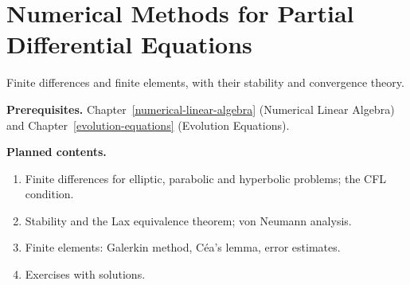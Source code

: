 \chapter{Numerical Methods for Partial Differential Equations}\label{numerical-pde}

Finite differences and finite elements, with their stability and convergence theory.

\noindent\textbf{Prerequisites.} Chapter~\ref{numerical-linear-algebra} (Numerical Linear Algebra) and Chapter~\ref{evolution-equations} (Evolution Equations).

\noindent\textbf{Planned contents.}
\begin{enumerate}
\item Finite differences for elliptic, parabolic and hyperbolic problems; the CFL condition.
\item Stability and the Lax equivalence theorem; von Neumann analysis.
\item Finite elements: Galerkin method, C\'ea's lemma, error estimates.
\item Exercises with solutions.
\end{enumerate}
